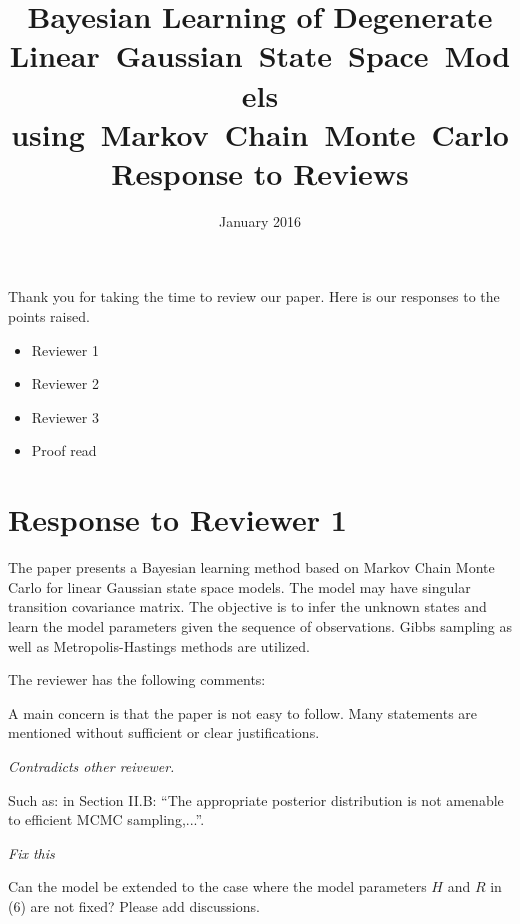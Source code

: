 \documentclass{article}
\title{Bayesian Learning of Degenerate Linear~Gaussian~State~Space~Models using~Markov~Chain~Monte~Carlo \\ Response to Reviews}
\date{January 2016}
\newenvironment{review}[0]{\begin{itshape}\color{Gray}\noindent}{\end{itshape}\vspace{0.4cm}}
\newenvironment{response}[0]{\noindent}{\vspace{0.4cm}}
\newcommand{\meta}[1]{{\color{red}\em #1}}
\begin{document}
\maketitle

Thank you for taking the time to review our paper. Here is our responses to the points raised.

\meta{
\begin{itemize}
 \item Reviewer 1
 \item Reviewer 2
 \item Reviewer 3
 \item Proof read
\end{itemize}

}

\section*{Response to Reviewer 1}

\begin{review}
The paper presents a Bayesian learning method based on Markov Chain Monte Carlo for linear Gaussian state space models. The model may have singular transition covariance matrix. The objective is to infer the unknown states and learn the model parameters given the sequence of observations. Gibbs sampling as well as Metropolis-Hastings methods are utilized.

The reviewer has the following comments:

A main concern is that the paper is not easy to follow. Many statements are mentioned without sufficient or clear justifications.
\end{review}

\begin{response}
 \meta{Contradicts other reivewer.}
\end{response}

\begin{review}
Such as: in Section II.B: ``The appropriate posterior distribution is not amenable to efficient MCMC sampling,...''.
\end{review}

\begin{response}
 \meta{Fix this}
\end{response}

\begin{review}
Can the model be extended to the case where the model parameters $H$ and $R$ in (6) are not fixed? Please add discussions.
\end{review}
\end{document}
